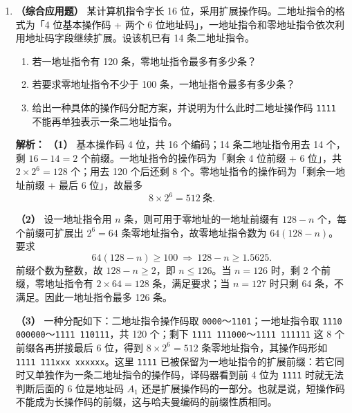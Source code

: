 \begin{enumerate}[leftmargin=*]
    \vspace{8pt}

    \item \textbf{（综合应用题）}
    某计算机指令字长 16 位，采用扩展操作码。二地址指令的格式为「4 位基本操作码 + 两个 6 位地址码」，一地址指令和零地址指令依次利用地址码字段继续扩展。设该机已有 14 条二地址指令。
    \begin{enumerate}
        \item[(1)] 若一地址指令有 120 条，零地址指令最多有多少条？
        \item[(2)] 若要求零地址指令不少于 100 条，一地址指令最多有多少条？
        \item[(3)] 给出一种具体的操作码分配方案，并说明为什么此时二地址操作码 \texttt{1111} 不能再单独表示一条二地址指令。
    \end{enumerate}

    \ifshowsolutions\par\noindent\textbf{解析：}
    \textbf{（1）} 基本操作码 4 位，共 16 个编码；14 条二地址指令用去 14 个，剩 $16-14=2$ 个前缀。一地址指令的操作码为「剩余 4 位前缀 + 6 位」，共 $2\times2^6=128$ 个；用去 120 个后还剩 8 个。零地址指令的操作码为「剩余一地址前缀 + 最后 6 位」，故最多
    \[
    8\times2^6=512\ \text{条}.
    \]

    \textbf{（2）} 设一地址指令用 $n$ 条，则可用于零地址的一地址前缀有 $128-n$ 个，每个前缀可扩展出 $2^6=64$ 条零地址指令，故零地址指令数为 $64(128-n)$。要求
    \[
    64(128-n)\geqslant 100\ \Longrightarrow\ 128-n\geqslant 1.5625.
    \]
    前缀个数为整数，故 $128-n\geqslant2$，即 $n\leqslant126$。当 $n=126$ 时，剩 2 个前缀，零地址指令有 $2\times64=128$ 条，满足要求；当 $n=127$ 时只剩 64 条，不满足。因此一地址指令最多 126 条。

    \textbf{（3）} 一种分配如下：二地址指令操作码取 \texttt{0000}～\texttt{1101}；一地址指令取 \texttt{1110 000000}～\texttt{1111 110111}，共 120 个；剩下 \texttt{1111 111000}～\texttt{1111 111111} 这 8 个前缀各再拼接最后 6 位，得到 $8\times2^6=512$ 条零地址指令，其操作码形如 \texttt{1111 111xxx xxxxxx}。这里 \texttt{1111} 已被保留为一地址指令的扩展前缀：若它同时又单独作为一条二地址指令的操作码，译码器看到前 4 位为 \texttt{1111} 时就无法判断后面的 6 位是地址码 $A_1$ 还是扩展操作码的一部分。也就是说，短操作码不能成为长操作码的前缀，这与哈夫曼编码的前缀性质相同。

    \begin{center}
    \end{center}
    \else \answerarea[10] \fi


\end{enumerate}
